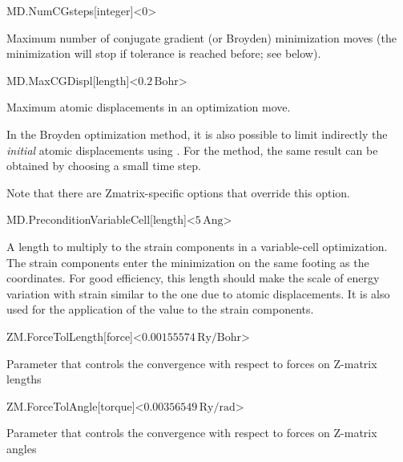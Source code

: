 \begin{fdfentry}{MD.NumCGsteps}[integer]<0>
  
  Maximum number of conjugate gradient (or Broyden) minimization moves
  (the minimization will stop if tolerance is reached before; see
   below).

\end{fdfentry}

\begin{fdfentry}{MD.MaxCGDispl}[length]<$0.2\,\mathrm{Bohr}$>
  
  Maximum atomic displacements in an optimization move.

  In the Broyden optimization method, it is also possible to limit
  indirectly the \textit{initial\/} atomic displacements using
  . For the  method, the
  same result can be obtained by choosing a small time step.

  Note that there are Zmatrix-specific options that override this option.

\end{fdfentry}

\begin{fdfentry}{MD.PreconditionVariableCell}[length]<$5\,\mathrm{Ang}$>
  
  A length to multiply to the strain components in a variable-cell
  optimization. The strain components enter the minimization on the
  same footing as the coordinates. For good efficiency, this length
  should make the scale of energy variation with strain similar to the
  one due to atomic displacements. It is also used for the application
  of the  value to the strain components.

\end{fdfentry}


\begin{fdfentry}{ZM.ForceTolLength}[force]<$0.00155574\,\mathrm{Ry/Bohr}$>
  
  Parameter that controls the convergence with respect to forces on
  Z-matrix lengths

\end{fdfentry}


\begin{fdfentry}{ZM.ForceTolAngle}[torque]<$0.00356549\,\mathrm{Ry/rad}$>
  
  Parameter that controls the convergence with respect to forces on
  Z-matrix angles

\end{fdfentry}

